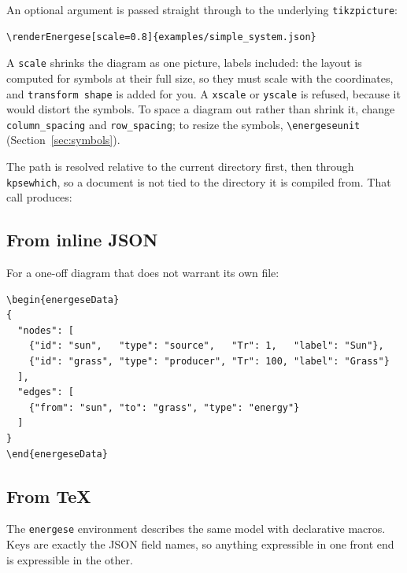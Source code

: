 \documentclass{article}
\begin{document}
An optional argument is passed straight through to the underlying
\texttt{tikzpicture}:

\begin{verbatim}
\renderEnergese[scale=0.8]{examples/simple_system.json}
\end{verbatim}

\noindent A \texttt{scale} shrinks the diagram as one picture, labels included:
the layout is computed for symbols at their full size, so they must scale with
the coordinates, and \texttt{transform shape} is added for you. A
\texttt{xscale} or \texttt{yscale} is refused, because it would distort the
symbols. To space a diagram out rather than shrink it, change
\texttt{column\_spacing} and \texttt{row\_spacing}; to resize the symbols,
\verb|\energeseunit| (Section~\ref{sec:symbols}).

The path is resolved relative to the current directory first, then through
\texttt{kpsewhich}, so a document is not tied to the directory it is compiled
from. That call produces:

\begin{center}
\end{center}

\subsection{From inline JSON}

For a one-off diagram that does not warrant its own file:

\begin{verbatim}
\begin{energeseData}
{
  "nodes": [
    {"id": "sun",   "type": "source",   "Tr": 1,   "label": "Sun"},
    {"id": "grass", "type": "producer", "Tr": 100, "label": "Grass"}
  ],
  "edges": [
    {"from": "sun", "to": "grass", "type": "energy"}
  ]
}
\end{energeseData}
\end{verbatim}

\subsection{From \TeX}

The \texttt{energese} environment describes the same model with declarative
macros. Keys are exactly the JSON field names, so anything expressible in one
front end is expressible in the other.
\end{document}
